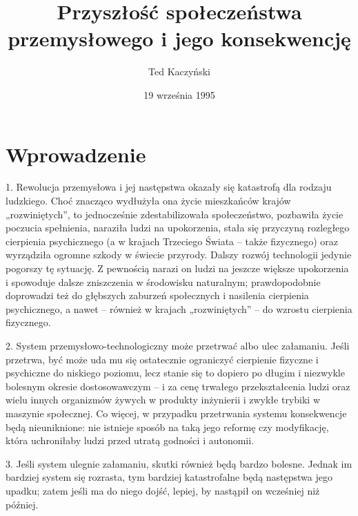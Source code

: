 \documentclass[11pt]{article}
\title{\textbf{Przyszłość społeczeństwa przemysłowego i jego konsekwencję}}
\author{Ted Kaczyński}
\date{19 września 1995}
\theoremstyle{definition}
\theoremstyle{plain}
\theoremstyle{remark}
\begin{document}
	
	\maketitle
	\newpage

\section*{Wprowadzenie}
	
1. Rewolucja przemysłowa i jej następstwa okazały się katastrofą dla rodzaju ludzkiego. Choć znacząco wydłużyła ona życie mieszkańców krajów „rozwiniętych”, to jednocześnie zdestabilizowała społeczeństwo, pozbawiła życie poczucia spełnienia, naraziła ludzi na upokorzenia, stała się przyczyną rozległego cierpienia psychicznego (a w krajach Trzeciego Świata – także fizycznego) oraz wyrządziła ogromne szkody w świecie przyrody. Dalszy rozwój technologii jedynie pogorszy tę sytuację. Z pewnością narazi on ludzi na jeszcze większe upokorzenia i spowoduje dalsze zniszczenia w środowisku naturalnym; prawdopodobnie doprowadzi też do głębszych zaburzeń społecznych i nasilenia cierpienia psychicznego, a nawet – również w krajach „rozwiniętych” – do wzrostu cierpienia fizycznego.

2. System przemysłowo-technologiczny może przetrwać albo ulec załamaniu. Jeśli przetrwa, być może uda mu się ostatecznie ograniczyć cierpienie fizyczne i psychiczne do niskiego poziomu, lecz stanie się to dopiero po długim i niezwykle bolesnym okresie dostosowawczym – i za cenę trwałego przekształcenia ludzi oraz wielu innych organizmów żywych w produkty inżynierii i zwykłe trybiki w maszynie społecznej. Co więcej, w przypadku przetrwania systemu konsekwencje będą nieuniknione: nie istnieje sposób na taką jego reformę czy modyfikację, która uchroniłaby ludzi przed utratą godności i autonomii.

3. Jeśli system ulegnie załamaniu, skutki również będą bardzo bolesne. Jednak im bardziej system się rozrasta, tym bardziej katastrofalne będą następstwa jego upadku; zatem jeśli ma do niego dojść, lepiej, by nastąpił on wcześniej niż później.
\end{document}
